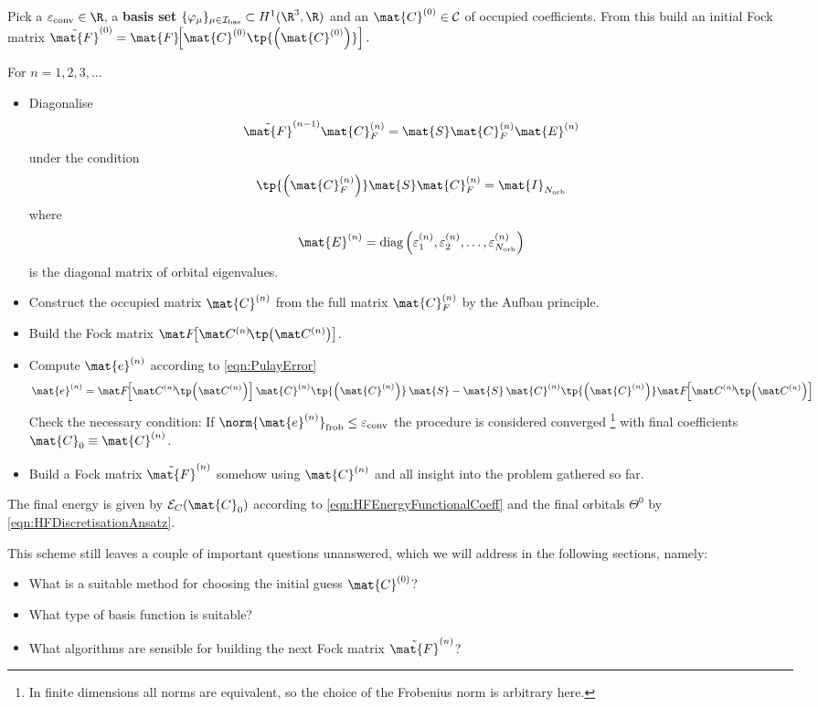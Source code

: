 \begin{rem}
	\label{rem:SCFcoeff}
	Pick a  $\epsilonconv \in \R$,
	a \textbf{basis set} $\{\varphi_\mu\}_{\mu\in\Ibas} \subset H^1(\R^3, \R)$
	and an  $\mat{C}^{(0)} \in \mathcal{C}$
	of occupied coefficients.
	From this build an initial Fock matrix
	$\tilde{\mat{F}}^{(0)} = \mat{F}\!\!\left[\mat{C}^{(0)} \tp{\left(\mat{C}^{(0)}\right)}\right].$

	\noindent
	For $n=1,2,3,\ldots$
	\begin{itemize}
		\item Diagonalise
			\[ \tilde{\mat{F}}^{(n-1)} \mat{C}_F^{(n)} = \mat{S} \mat{C}_F^{(n)} \mat{E}^{(n)} \]
			under the condition
			\[ \tp{\left(\mat{C}_F^{(n)}\right)} \mat{S}  \mat{C}_F^{(n)} = \mat{I}_{\Norb} \]
			where
			\[
				\mat{E}^{(n)}
				= \text{diag}\left(\varepsilon_1^{(n)},
				\varepsilon_2^{(n)}, \ldots,
				\varepsilon_{\Norb}^{(n)}\right)
			\]
			is the diagonal matrix of orbital eigenvalues.
		\item Construct the occupied matrix $\mat{C}^{(n)}$
			from the full matrix $\mat{C}_F^{(n)}$ by the Aufbau principle.
		\item Build the Fock matrix $\matFnfull$.
		\item Compute $\mat{e}^{(n)}$ according to \eqref{eqn:PulayError}
			\[
			\mat{e}^{(n)}
			= \matFnfull \mat{C}^{(n)} \tp{\left(\mat{C}^{(n)}\right)} \, \mat{S}
			- \mat{S} \, \mat{C}^{(n)} \tp{\left(\mat{C}^{(n)}\right)} \matFnfull
			\]
			Check the necessary condition:
			If $\norm{ \mat{e}^{(n)} }_\text{frob} \leq  \epsilonconv$
			the procedure is considered converged%
			\footnote{In finite dimensions all norms are equivalent,
				so the choice of the Frobenius norm is arbitrary here.}
			with final coefficients $\mat{C}_0 \equiv \mat{C}^{(n)}$.
		\item Build a Fock matrix $\tilde{\mat{F}}^{(n)}$ somehow
			using $\mat{C}^{(n)}$ and all insight into the problem gathered so far.
	\end{itemize}
	The final \HF energy is given by $\mathcal{E}_C(\mat{C}_0)$
	according to \eqref{eqn:HFEnergyFunctionalCoeff} and the final
	\SCF orbitals $\Theta^0$ by \eqref{eqn:HFDiscretisationAnsatz}.
\end{rem}
This scheme still leaves a couple of important questions unanswered,
which we will address in the following sections, namely:
\begin{itemize}
	\item What is a suitable method for choosing the initial guess $\mat{C}^{(0)}$?
	\item What type of basis function is suitable?
	\item What algorithms are sensible for building the next
		Fock matrix $\tilde{\mat{F}}^{(n)}$?
\end{itemize}
